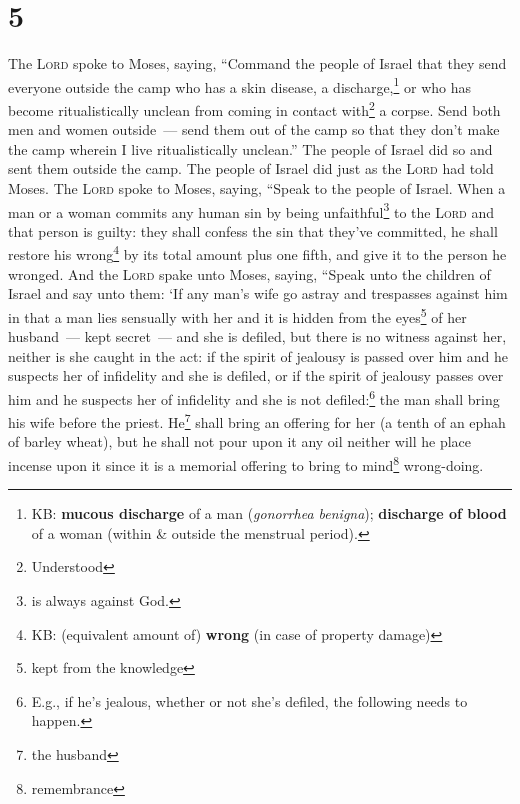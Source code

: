 \section{5}
\begin{enumerate}[align=center]
     The \textsc{Lord} spoke to Moses, saying,%
     ``Command the people of Israel that they send everyone outside the camp who has a skin disease, a discharge,\footnote{KB: \textbf{mucous discharge} of a man (\textit{gonorrhea benigna}); \textbf{discharge of blood} of a woman (within \& outside the menstrual period).} or who has become ritualistically unclean from coming in contact with\footnote{Understood} a corpse.%
     Send both men and women outside~--- send them out of the camp so that they don't make the camp wherein I live ritualistically unclean.''%
     The people of Israel did so and sent them outside the camp. The people of Israel did just as the \textsc{Lord} had told Moses.%
     The \textsc{Lord} spoke to Moses, saying,%
     ``Speak to the people of Israel. When a man or a woman commits any human sin by being unfaithful\footnote{ is always against God.} to the \textsc{Lord} and that person is guilty:%
     they shall confess the sin that they've committed, he shall restore his wrong\footnote{KB: (equivalent amount of) \textbf{wrong} (in case of property damage)} by its total amount plus one fifth, and give it to the person he wronged.%
     And the \textsc{Lord} spake unto Moses, saying,%
     ``Speak unto the children of Israel and say unto them: `If any man's wife go astray and trespasses against him%
     in that a man lies sensually with her and it is hidden from the eyes\footnote{kept from the knowledge} of her husband~--- kept secret~--- and she is defiled, but there is no witness against her, neither is she caught in the act:%
     if the spirit of jealousy is passed over him and he suspects her of infidelity and she is defiled, or if the spirit of jealousy passes over him and he suspects her of infidelity and she is not defiled:\footnote{E.g., if he's jealous, whether or not she's defiled, the following needs to happen.}%
     the man shall bring his wife before the priest. He\footnote{the husband} shall bring an offering for her (a tenth of an ephah of barley wheat), but he shall not pour upon it any oil neither will he place incense upon it since it is a memorial offering to bring to mind\footnote{remembrance} wrong-doing.%

\end{enumerate}

